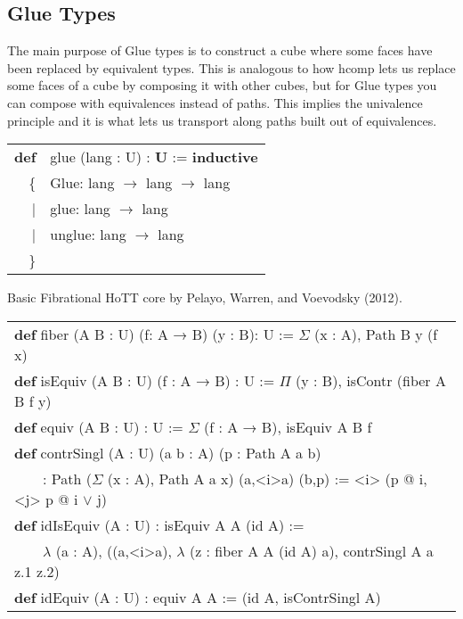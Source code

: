 \documentclass[a4paper,UKenglish,cleveref, autoref, thm-restate]{lipics-v2021}
\newcommand{\tabstyle}[0]{\scriptsize\ttfamily\fontseries{l}\selectfont}
\begin{document}
\newpage
\subsection{Glue Types}

The main purpose of Glue types is to construct a cube where some faces have
been replaced by equivalent types. This is analogous to how hcomp lets us
replace some faces of a cube by composing it with other cubes, but for Glue
types you can compose with equivalences instead of paths. This implies the
univalence principle and it is what lets us transport along paths built
out of equivalences.

\begin{table}[ht]
\tabstyle
\begin{tabular}{rl}
     \textbf{def} & glue (lang : U) : \textbf{U} := \textbf{inductive} \\
 \{ & Glue: lang $\rightarrow$ lang $\rightarrow$ lang \\
  |& glue: lang $\rightarrow$ lang \\
  |& unglue: lang $\rightarrow$ lang \\
                         \} & \\
\end{tabular}
\end{table}

Basic Fibrational HoTT core by Pelayo, Warren, and Voevodsky (2012).

\begin{table}[ht]
\tabstyle
\begin{tabular}{l}
\textbf{def} fiber (A B : U) (f: A → B) (y : B): U := $\Sigma$ (x : A), Path B y (f x) \\
\textbf{def} isEquiv (A B : U) (f : A → B) : U := $\Pi$ (y : B), isContr (fiber A B f y) \\
\textbf{def} equiv (A B : U) : U := $\Sigma$ (f : A → B), isEquiv A B f \\
\textbf{def} contrSingl (A : U) (a b : A) (p : Path A a b) \\
\ \ \ \ : Path ($\Sigma$ (x : A), Path A a x) (a,<i>a) (b,p) := <i> (p @ i, <j> p @ i $\vee$ j) \\
\textbf{def} idIsEquiv (A : U) : isEquiv A A (id A) := \\
\ \ \ \ $\lambda$ (a : A), ((a,<i>a), $\lambda$ (z : fiber A A (id A) a), contrSingl A a z.1 z.2) \\
\textbf{def} idEquiv (A : U) : equiv A A := (id A, isContrSingl A) \\
\end{tabular}
\end{table}
\end{document}
